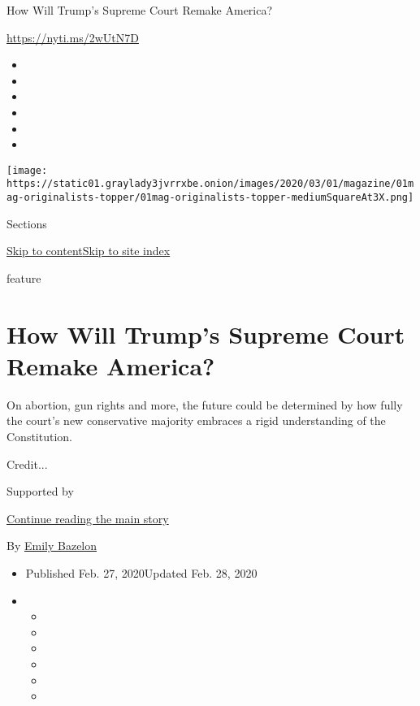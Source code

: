 How Will Trump's Supreme Court Remake America?

\url{https://nyti.ms/2wUtN7D}

\begin{itemize}
\item
\item
\item
\item
\item
\item
\end{itemize}

\texttt{[image: https://static01.graylady3jvrrxbe.onion/images/2020/03/01/magazine/01mag-originalists-topper/01mag-originalists-topper-mediumSquareAt3X.png]}

Sections

\protect\hyperlink{site-content}{Skip to
content}\protect\hyperlink{site-index}{Skip to site index}

feature

\hypertarget{how-will-trumps-supreme-court-remake-america}{%
\section{How Will Trump's Supreme Court Remake
America?}\label{how-will-trumps-supreme-court-remake-america}}

On abortion, gun rights and more, the future could be determined by how
fully the court's new conservative majority embraces a rigid
understanding of the Constitution.

Credit...

Supported by

\protect\hyperlink{after-sponsor}{Continue reading the main story}

By \href{https://www.nytimes3xbfgragh.onion/by/emily-bazelon}{Emily
Bazelon}

\begin{itemize}
\item
  Published Feb. 27, 2020Updated Feb. 28, 2020
\item
  \begin{itemize}
  \item
  \item
  \item
  \item
  \item
  \item
  \end{itemize}
\end{itemize}


